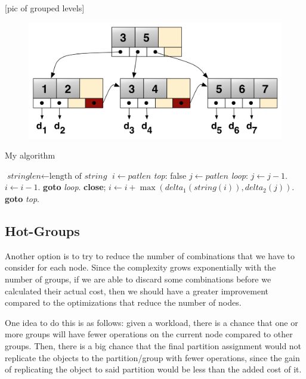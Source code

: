 [pic of grouped levels]
\begin{figure}[!htb]
  \centering
  \includegraphics[width=\textwidth,height=\textheight,keepaspectratio]{img/b+tree.png}
  \caption[caption]{ }
  \label{fig:variable-size-buckets}
\end{figure}

\begin{algorithm}
  \caption{My algorithm}\label{euclid}
  \begin{algorithmic}[1]
  \State $\textit{stringlen} \gets \text{length of }\textit{string}$
  \State $i \gets \textit{patlen}$
  \State \emph{top}:
   \Return false
  \EndIf
  \State $j \gets \textit{patlen}$
  \State \emph{loop}:
  \State $j \gets j-1$.
  \State $i \gets i-1$.
  \State \textbf{goto} \emph{loop}.
  \State \textbf{close};
  \EndIf
  \State $i \gets i+\max(\textit{delta}_1(\textit{string}(i)),\textit{delta}_2(j))$.
  \State \textbf{goto} \emph{top}.
  \EndProcedure
  \end{algorithmic}
  \end{algorithm}

\subsection{Hot-Groups}\label{sec:hot-groups}
Another option is to try to reduce the number of combinations that we have to consider for each node. Since the complexity grows exponentially with the number of groups, if we are able to discard some combinations before we calculated their actual cost, then we should have a greater improvement compared to the optimizations that reduce the number of nodes.

One idea to do this is as follows: given a workload, there is a chance that one or more groups will have fewer operations on the current node compared to other groups. Then, there is a big chance that the final partition assignment would not replicate the objects to the partition/group with fewer operations, since the gain of replicating the object to said partition would be less than the added cost of it.


